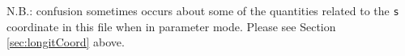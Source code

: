N.B.: confusion sometimes occurs about some of the quantities related
to the {\tt s} coordinate in this file when in parameter mode.  Please
see Section \ref{sec:longitCoord} above.

